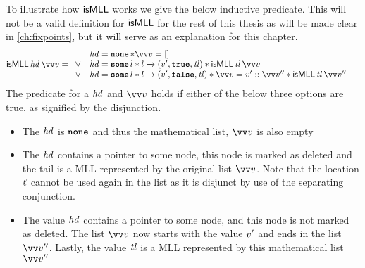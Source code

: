 \documentclass[thesis.tex]{subfiles}
\begin{document}
To illustrate how $\textsf{\upshape isMLL}$ works we give the below inductive predicate. This will not be a valid definition for $\textsf{\upshape isMLL}$ for the rest of this thesis as will be made clear in \cref*{ch:fixpoints}, but it will serve as an explanation for this chapter.
\begin{align*}
  \isMLL\, \langv{hd}\, \vect{\val} & =
  \begin{array}{cl}
         & \langv{hd} = \None * \vect{\val} = []                                                                                                      \\
    \lor & \langv{hd} = \Some l * l \fmapsto (\val', \True, \langv{tl}) * \isMLL\, \langv{tl}\, \vect{\val}                                           \\
    \lor & \langv{hd} = \Some l * l \fmapsto (\val', \False, \langv{tl}) * \vect{\val} = \val' :: \vect{\val}'' * \isMLL\, \langv{tl}\, \vect{\val}''
  \end{array}
\end{align*}
The predicate \isMLL for a $\mathit{hd}$ and $\vect{\val}$ holds if either of the below three options are true, as signified by the disjunction.
\begin{itemize}
  \item The $\mathit{hd}$ is $\operatorname{\texttt{\bfseries none}}$ and thus the mathematical list, $\vect{\val}$ is also empty
  \item The $\mathit{hd}$ contains a pointer to some node, this node is marked as deleted and the tail is a MLL represented by the original list $\vect{\val}$. Note that the location $\ell$ cannot be used again in the list as it is disjunct by use of the separating conjunction.
  \item The value $\mathit{hd}$ contains a pointer to some node, and this node is not marked as deleted. The list $\vect{\val}$ now starts with the value $v'$ and ends in the list $\vect{\val}''$. Lastly, the value $\mathit{tl}$ is a MLL represented by this mathematical list $\vect{\val}''$
\end{itemize}
\end{document}
